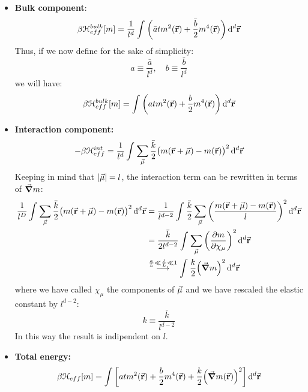 \documentclass[../../Main/Main.tex]{subfiles}
\begin{document}
\begin{itemize}
\item \textbf{Bulk component}:
\begin{equation}
  \beta \mathcal{H}_{eff}^{bulk} [m] =  \frac{1}{l^d} \int_{}^{} \qty( \bar{a} t m^2 (\va{r})+ \frac{\bar{b} }{2} m^4 (\va{r})  )  \dd[d]{\va{r}}
\end{equation}
Thus, if we now define for the sake of simplicity:
\begin{equation*}
  a \equiv \frac{\bar{a} }{l^d}, \quad b \equiv \frac{\bar{b} }{l^d}
\end{equation*}
we will have:
\begin{equation*}
  \beta \mathcal{H}_{eff}^{bulk} [m] = \int_{}^{} \qty( a t m^2 (\va{r})+ \frac{b }{2} m^4 (\va{r})  )  \dd[d]{\va{r}}
\end{equation*}


\item \textbf{Interaction component:}
\begin{equation}
  - \beta \mathcal{H}_{eff}^{int} =   \frac{1}{l^d} \int_{}^{}  \sum_{\va{\mu }}^{}  \frac{\bar{k} }{2} \big( m (\va{r}+\va{\mu }) - m(\va{r})\big)^2  \dd[d]{\va{r}}
 \end{equation}
 Keeping in mind that \( \abs{\va{\mu }}  = l \), the interaction term can be rewritten in terms of \( \va{\grad } m\):
\begin{equation*}
\begin{split}
\frac{1}{l^D} \int_{}^{}  \sum_{\va{\mu }}^{}  \frac{\bar{k} }{2} \big( m (\va{r}+\va{\mu }) - m(\va{r})\big)^2  \dd[d]{\va{r}} & = \frac{1}{l^{d-2}} \int_{}^{}
\frac{\bar{k} }{2} \sum_{\va{\mu }}^{}  \qty(\frac{m (\va{r}+\va{\mu }) - m(\va{r})}{l})^2 \dd[d]{\va{r}} \\
& = \frac{\bar{k} }{2l^{d-2}} \int_{}^{}
\sum_{\va{\mu }}^{}  \qty(\pdv{m}{ \chi  _ \mu } )^2 \dd[d]{\va{r}} \\
& \overset{\frac{a}{L} \ll \frac{l}{L} \ll 1}{\longrightarrow }  \int_{}^{}   \frac{k }{2} \qty(\va{\grad } m)^2  \dd[d]{\va{r}}
\end{split}
\end{equation*}
where we have called \( \chi _{\mu } \)  the components of \( \va{\mu } \) and we have rescaled the elastic constant by \( l^{d-2} \):
\begin{equation*}
  k \equiv  \frac{ \bar{k} }{l^{d-2}}
\end{equation*}
In this way the result is indipendent on \( l \).


\item \textbf{Total energy:}
\begin{equation}
  \beta \mathcal{H}_{eff} [m] = \int_{}^{}  \qty[a t m^2 (\va{r}) + \frac{b}{2} m^4 (\va{r}) + \frac{k}{2} \qty(\va{\grad } m (\va{r}))^2] \dd[d]{\va{r}}
\end{equation}
\end{itemize}
\end{document}
